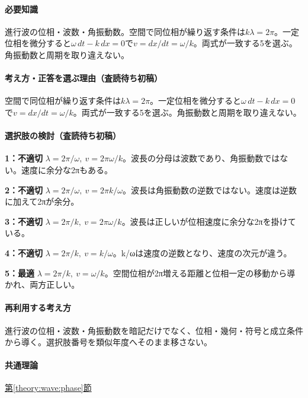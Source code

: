 \paragraph{必要知識} 進行波の位相・波数・角振動数。空間で同位相が繰り返す条件は\(k\lambda=2\pi\)。一定位相を微分すると\(\omega\,dt-k\,dx=0\)で\(v=dx/dt=\omega/k\)。両式が一致する5を選ぶ。角振動数と周期を取り違えない。

\paragraph{考え方・正答を選ぶ理由（査読待ち初稿）} 空間で同位相が繰り返す条件は\(k\lambda=2\pi\)。一定位相を微分すると\(\omega\,dt-k\,dx=0\)で\(v=dx/dt=\omega/k\)。両式が一致する5を選ぶ。角振動数と周期を取り違えない。

\paragraph{選択肢の検討（査読待ち初稿）}\mbox{}\par

\noindent\textbf{1：不適切} \(\lambda=2\pi/\omega,\ v=2\pi\omega/k\)。波長の分母は波数であり、角振動数ではない。速度に余分な2πもある。\par

\noindent\textbf{2：不適切} \(\lambda=2\pi/\omega,\ v=2\pi k/\omega\)。波長は角振動数の逆数ではない。速度は逆数に加えて2πが余分。\par

\noindent\textbf{3：不適切} \(\lambda=2\pi/k,\ v=2\pi\omega/k\)。波長は正しいが位相速度に余分な2πを掛けている。\par

\noindent\textbf{4：不適切} \(\lambda=2\pi/k,\ v=k/\omega\)。k/ωは速度の逆数となり、速度の次元が違う。\par

\noindent\textbf{5：最適} \(\lambda=2\pi/k,\ v=\omega/k\)。空間位相が2π増える距離と位相一定の移動から導かれ、両方正しい。\par

\paragraph{再利用する考え方} 進行波の位相・波数・角振動数を暗記だけでなく、位相・幾何・符号と成立条件から導く。選択肢番号を類似年度へそのまま移さない。

\paragraph{共通理論} \hyperref[theory:wave:phase]{第\ref*{theory:wave:phase}節}

